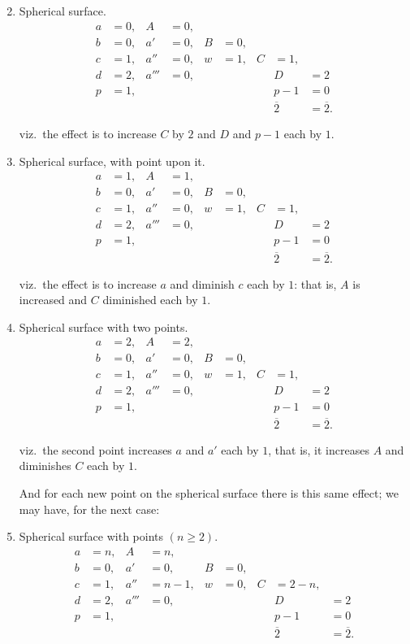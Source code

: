 \documentclass[11pt,a4paper]{book}
\begin{document}
\begin{enumerate}
\setcounter{enumi}{1}
\item Spherical surface.
\begin{align*}
a &= 0, & A &= 0, \\
b &= 0, & a' &= 0, & B &= 0, \\
c &= 1, & a'' &= 0, & w &= 1, & C &= 1, \\
d &= 2, & a''' &= 0, & & & & D &= 2 \\
p &= 1, & & & & & & p - 1 &= 0 \\[2pt]
& & & & & & & \overline{2} &= \overline{2}.
\end{align*}

viz.\ the effect is to increase $C$ by $2$ and $D$ and $p-1$ each by $1$.

\item Spherical surface, with point upon it.
\begin{align*}
a &= 1, & A &= 1, \\
b &= 0, & a' &= 0, & B &= 0, \\
c &= 1, & a'' &= 0, & w &= 1, & C &= 1, \\
d &= 2, & a''' &= 0, & & & & D &= 2 \\
p &= 1, & & & & & & p - 1 &= 0 \\[2pt]
& & & & & & & \overline{2} &= \overline{2}.
\end{align*}

viz.\ the effect is to increase $a$ and diminish $c$ each by $1$: that is, $A$ is increased
and $C$ diminished each by $1$.

\item Spherical surface with two points.
\begin{align*}
a &= 2, & A &= 2, \\
b &= 0, & a' &= 0, & B &= 0, \\
c &= 1, & a'' &= 0, & w &= 1, & C &= 1, \\
d &= 2, & a''' &= 0, & & & & D &= 2 \\
p &= 1, & & & & & & p - 1 &= 0 \\[2pt]
& & & & & & & \overline{2} &= \overline{2}.
\end{align*}

viz.\ the second point increases $a$ and $a'$ each by $1$, that is, it increases $A$ and
diminishes $C$ each by $1$.

And for each new point on the spherical surface there is this same effect; we
may have, for the next case:

\item Spherical surface with points $(n \geq 2)$.
\begin{align*}
a &= n, & A &= n, \\
b &= 0, & a' &= 0, & B &= 0, \\
c &= 1, & a'' &= n - 1, & w &= 0, & C &= 2 - n, \\
d &= 2, & a''' &= 0, & & & & D &= 2 \\
p &= 1, & & & & & & p - 1 &= 0 \\[2pt]
& & & & & & & \overline{2} &= \overline{2}.
\end{align*}
\end{enumerate}
\end{document}
